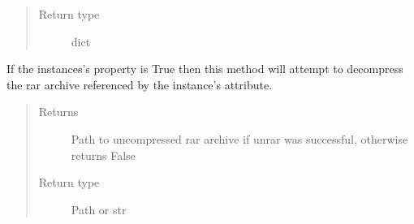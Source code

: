 \documentclass[letterpaper,10pt,english]{sphinxmanual}
\begin{document}
\begin{fulllineitems}
\begin{fulllineitems}
\begin{quote}
\begin{description}
\item[{Return type}] \leavevmode
dict

\end{description}\end{quote}

\end{fulllineitems}


\begin{fulllineitems}
\label{\detokenize{polo.windows:polo.windows.run_importer.ImportCandidate.set_cocktail_menu}}
\end{fulllineitems}


\begin{fulllineitems}
\label{\detokenize{polo.windows:polo.windows.run_importer.ImportCandidate.unrar}}
If the {\hyperref[\detokenize{polo.windows:polo.windows.run_importer.ImportCandidate}]{}} instances’s {\hyperref[\detokenize{polo.windows:polo.windows.run_importer.ImportCandidate.is_rar}]{}}
property is True then this method will attempt to de\sphinxhyphen{}compress the 
rar archive referenced by the instance’s 
{\hyperref[\detokenize{polo.windows:polo.windows.run_importer.ImportCandidate.path}]{}} attribute.
\begin{quote}\begin{description}
\item[{Returns}] \leavevmode
Path to un\sphinxhyphen{}compressed rar archive if unrar was successful, 
otherwise returns False

\item[{Return type}] \leavevmode
Path or str

\end{description}\end{quote}

\end{fulllineitems}


\end{fulllineitems}
\end{document}

